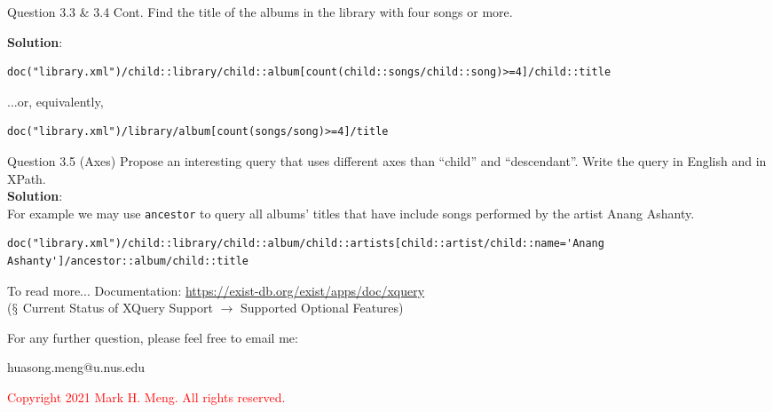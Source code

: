 \begin{frame}[fragile]{Question 3.3 \& 3.4 Cont.}
Find the title of the albums in the library with four songs or more.\\\vspace{5pt}
	
\textbf{Solution}: \\
\begin{lstlisting}[style=xml-small-nomargin]
doc("library.xml")/child::library/child::album[count(child::songs/child::song)>=4]/child::title
\end{lstlisting}\vspace{5pt}
...or, equivalently,
\begin{lstlisting}[style=xml-small-nomargin]
doc("library.xml")/library/album[count(songs/song)>=4]/title
\end{lstlisting}\vspace{5pt}

\end{frame}


\begin{frame}[fragile]{Question 3.5 (Axes)}
Propose an interesting query that uses different axes than ``child'' and ``descendant''. Write the query in English and in XPath.\\\vspace{10pt}
\textbf{Solution}: \\
For example we may use \texttt{ancestor} to query all albums' titles that have include songs performed by the artist Anang Ashanty.
\begin{lstlisting}[style=xml-small-nomargin]
doc("library.xml")/child::library/child::album/child::artists[child::artist/child::name='Anang Ashanty']/ancestor::album/child::title
\end{lstlisting}\vspace{5pt}

\begin{block}{To read more...}
	Documentation: \url{https://exist-db.org/exist/apps/doc/xquery} \\
	($\mathsection$ Current Status of XQuery Support $\rightarrow$ Supported Optional Features)
\end{block}	
\end{frame}

\begin{frame}{}
	\centering  
	For any further question, please feel free to email me:\vspace{10pt}
	
	huasong.meng@u.nus.edu \vspace{20pt}
	
	\begin{tcolorbox}
		\begin{center}
			\textcolor{red}{Copyright 2021 Mark H. Meng. All rights reserved.}
		\end{center}
	\end{tcolorbox}
\end{frame}